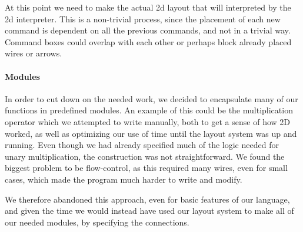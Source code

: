 At this point we need to make the actual 2d layout that will
interpreted by the 2d interpreter. This is a non-trivial process,
since the placement of each new command is dependent on all the
previous commands, and not in a trivial way. Command boxes could
overlap with each other or perhaps block already placed wires or
arrows.

\paragraph{Modules}
\label{compiler:modules}
In order to cut down on the needed work, we decided to encapsulate
many of our functions in predefined modules. An example of this could
be the multiplication operator which we attempted to write manually,
both to get a sense of how 2D worked, as well as optimizing our use of
time until the layout system was up and running. Even though we had
already specified much of the logic needed for unary multiplication,
the construction was not straightforward. We found the biggest
problem to be flow-control, as this required many wires, even for
small cases, which made the program much harder to write and modify.

We therefore abandoned this approach, even for basic features of our
language, and given the time we would instead have used our layout
system to make all of our needed modules, by specifying the connections.

